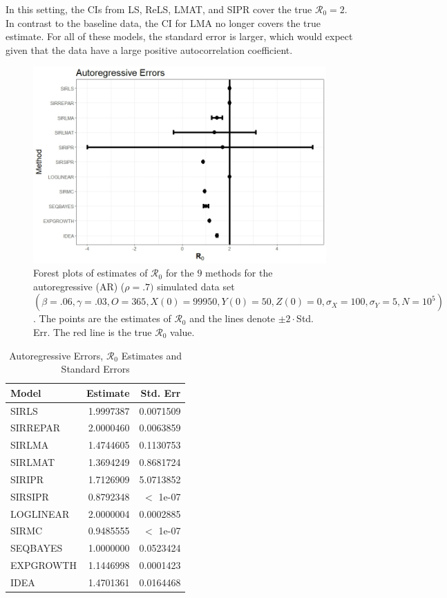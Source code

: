 \documentclass[12pt]{article}
\newcommand{\xxsir}{\ensuremath{9} } %
\newcommand{\rr}{\ensuremath{\mathcal{R}_0}}
\begin{document}
In this setting, the CIs from LS, ReLS, LMAT, and SIPR cover the true $\rr=2$.  In contrast to the baseline data, the CI for LMA no longer covers the true estimate.  For all of these models, the standard error is larger, which would expect given that the data have a large positive autocorrelation coefficient.


\begin{figure}[H]
  \centering
  \includegraphics[scale=0.5]{images/AR.jpeg}
  \caption{Forest plots of estimates of $\rr$ for the \xxsir methods for the autoregressive (AR) ($\rho=.7)$ simulated data set $(\beta=.06, \gamma=.03, O=365, X(0)=99950, Y(0)=50, Z(0)=0, \sigma_X=100, \sigma_Y=5, N=10^5)$.  The points are the estimates of $\rr$ and the lines denote $\pm 2\cdot $Std. Err.  The red line is the true $\rr$ value.}
  \end{figure}\label{fig:ar-res}
\begin{table}[H]
	
	\centering
	\begin{tabular}[t]{l|r|r}
		\hline
		Model & Estimate & Std. Err\\
		\hline
		SIRLS & 1.9997387 & 0.0071509\\
		\hline
		SIRREPAR & 2.0000460 & 0.0063859\\
		\hline
		SIRLMA & 1.4744605 & 0.1130753\\
		\hline
		SIRLMAT & 1.3694249 & 0.8681724\\
		\hline
		SIRIPR & 1.7126909 & 5.0713852\\
		\hline
		SIRSIPR & 0.8792348 & $<$ 1e-07 \\
		\hline
		LOGLINEAR & 2.0000004 & 0.0002885\\
		\hline
		SIRMC & 0.9485555 & $<$ 1e-07 \\
		\hline
		SEQBAYES & 1.0000000 & 0.0523424\\
		\hline
		EXPGROWTH & 1.1446998 & 0.0001423\\
		\hline
		IDEA & 1.4701361 & 0.0164468\\
		\hline
	\end{tabular}
        \caption{Autoregressive Errors, $\rr$ Estimates and Standard Errors}\label{tab:ar-res}
\end{table}
\end{document}
